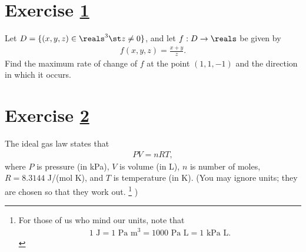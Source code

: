 %
%
%
%

\section{Exercise \ref{sec: Math212 2016 Fall HalfExam02Q09}}
\label{sec: Math212 2016 Fall HalfExam02Q09}


Let $D = \{(x,y,z) \in \reals^{3} \st z \neq 0\}$, and let $f: D \rightarrow \reals$ be given by
\begin{align*}
f(x,y,z)
=
\frac{x + y}{z}.
\end{align*}
Find the maximum rate of change of $f$ at the point $(1,1,-1)$ and the direction in which it occurs.






%
%
%
%

\section{Exercise \ref{sec: Math212 2016 Fall HalfExam02Q10}}
\label{sec: Math212 2016 Fall HalfExam02Q10}

The ideal gas law states that
\begin{align}
P V
=
n R T,%
\label{eq: Ideal Gas Law}
\end{align}
where $P$ is pressure (in kPa), $V$ is volume (in L), $n$ is number of moles, $R = 8.3144$ J/(mol K), and $T$ is temperature (in K). (You may ignore units; they are chosen so that they work out.%
\footnote{For those of us who mind our units, note that
\begin{align*}
1\text{ J}
=
1\text{ Pa m}^{3}
=
1000\text{ Pa L}
=
1\text{ kPa L}.
\end{align*}
}%
)

